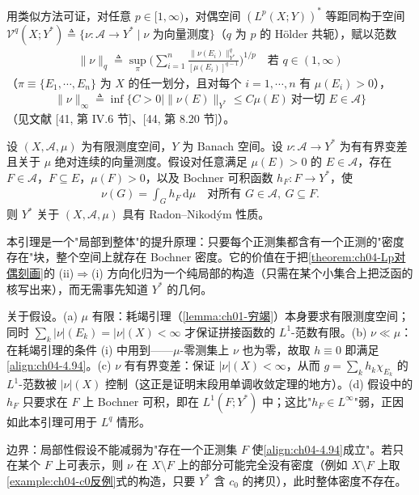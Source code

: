 \documentclass[../../main.tex]{subfiles}%
\begin{document}
\begin{remark}\label{remark:ch04-对偶向量测度刻画}
用类似方法可证，对任意 $p\in[1,\infty)$，对偶空间 $(L^p(X;Y))^*$ 等距同构于空间 $\mathcal{V}^q(X;Y^*)\triangleq\{\nu:\mathcal{A}\to Y^*\mid\nu\text{ 为向量测度}\}$（$q$ 为 $p$ 的 Hölder 共轭），赋以范数
\begin{align*}
\|\nu\|_q\triangleq\sup_{\pi}\Big(\sum_{i=1}^n\frac{\|\nu(E_i)\|_{Y^*}^q}{[\mu(E_i)]^{q-1}}\Big)^{1/p}\quad\text{若 }q\in(1,\infty)
\end{align*}
（$\pi\equiv\{E_1,\cdots,E_n\}$ 为 $X$ 的任一划分，且对每个 $i=1,\cdots,n$ 有 $\mu(E_i)>0$），
\begin{align*}
\|\nu\|_\infty\triangleq\inf\{C>0\mid\|\nu(E)\|_{Y^*}\leqslant C\mu(E)\ \text{对一切 }E\in\mathcal{A}\}
\end{align*}
（见文献 [41, 第 IV.6 节]、[44, 第 8.20 节]）。
\end{remark}

\begin{lemma}\label{lemma:ch04-RNP局部}
设 $(X,\mathcal{A},\mu)$ 为有限测度空间，$Y$ 为 Banach 空间。设 $\nu:\mathcal{A}\to Y^*$ 为有有界变差且关于 $\mu$ 绝对连续的向量测度。假设对任意满足 $\mu(E)>0$ 的 $E\in\mathcal{A}$，存在 $F\in\mathcal{A}$，$F\subseteq E$，$\mu(F)>0$，以及 Bochner 可积函数 $h_F:F\to Y^*$，使
\begin{align}
\nu(G)=\int_G h_F\,\mathrm{d}\mu\quad\text{对所有 }G\in\mathcal{A},\ G\subseteq F. \label{align:ch04-4.94}
\end{align}
则 $Y^*$ 关于 $(X,\mathcal{A},\mu)$ 具有 Radon--Nikodým 性质。
\end{lemma}

\begin{remark}\label{remark:ch04-RNP局部}
本引理是一个"局部到整体"的提升原理：只要每个正测集都含有一个正测的"密度存在"块，整个空间上就存在 Bochner 密度。它的价值在于把\cref{theorem:ch04-Lp对偶刻画}的 (ii)$\Rightarrow$(i) 方向化归为一个纯局部的构造（只需在某个小集合上把泛函的核写出来），而无需事先知道 $Y^*$ 的几何。

关于假设。(a) $\mu$ 有限：耗竭引理（\cref{lemma:ch01-穷竭}）本身要求有限测度空间；同时 $\sum_k|\nu|(E_k)=|\nu|(X)<\infty$ 才保证拼接函数的 $L^1$-范数有限。(b) $\nu\ll\mu$：在耗竭引理的条件 (i) 中用到——$\mu$-零测集上 $\nu$ 也为零，故取 $h\equiv0$ 即满足\eqref{align:ch04-4.94}。(c) $\nu$ 有有界变差：保证 $|\nu|(X)<\infty$，从而 $g=\sum_kh_k\chi_{E_k}$ 的 $L^1$-范数被 $|\nu|(X)$ 控制（这正是证明末段用单调收敛定理的地方）。(d) 假设中的 $h_F$ 只要求在 $F$ 上 Bochner 可积，即在 $L^1(F;Y^*)$ 中；这比"$h_F\in L^\infty$"弱，正因如此本引理可用于 $L^q$ 情形。

边界：局部性假设不能减弱为"存在一个正测集 $F$ 使\eqref{align:ch04-4.94}成立"。若只在某个 $F$ 上可表示，则 $\nu$ 在 $X\setminus F$ 上的部分可能完全没有密度（例如 $X\setminus F$ 上取\cref{example:ch04-c0反例}式的构造，只要 $Y^*$ 含 $c_0$ 的拷贝），此时整体密度不存在。
\end{remark}
\end{document}
